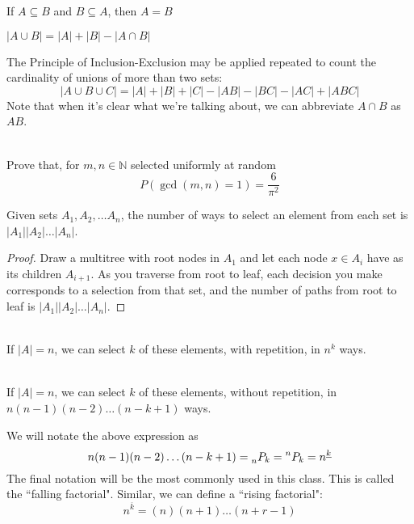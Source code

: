 \begin{theorem}
If $A \subseteq B$ and $B \subseteq A$, then $A = B$
\end{theorem}
\begin{theorem}
$|A\cup B| = |A| + |B| - |A \cap B|$
\end{theorem}
The Principle of Inclusion-Exclusion may be applied repeated to count the cardinality of unions of more than two sets:
$$|A\cup B\cup C| = |A| + |B| + |C| - |AB| - |BC| - |AC| + |ABC|$$
Note that when it's clear what we're talking about, we can abbreviate $A\cap B$ as $AB$.

\begin{problem} \\
Prove that, for $m,n\in\mathbb{N}$ selected uniformly at random $$P(\gcd(m,n)=1) = \frac{6}{\pi^2}$$
\end{problem}
\begin{theorem}
Given sets $A_1, A_2, \dots A_n$, the number of ways to select an element from each set is $|A_1||A_2|\dots|A_n|$. 
\end{theorem}
\begin{proof}
Draw a multitree  with root nodes in $A_1$ and let each node $x\in A_i$ have as its children $A_{i+1}$. As you traverse from root to leaf, each decision you make corresponds to a selection from that set, and the number of paths from root to leaf is $|A_1||A_2|\dots|A_n|$.
\end{proof}
\begin{corollary}\\
If $|A| = n$, we can select $k$ of these elements, with repetition, in $n^k$ ways.
\end{corollary}
\begin{corollary}\\
If $|A| = n$, we can select $k$ of these elements, without repetition, in $n(n-1)(n-2)\dots (n-k+1)$ ways.
\end{corollary}
We will notate the above expression as 
$$n(n-1)(n-2)\dots(n-k+1) =\prescript{}{n}{P_k} = \prescript{n}{}{P_k}=n^{\underline{k}}$$
The final notation will be the most commonly used in this class. This is called the ``falling factorial". Similar, we can define a ``rising factorial":
$$n^{\overline{k}}=(n)(n+1)\dots(n+r-1)$$

